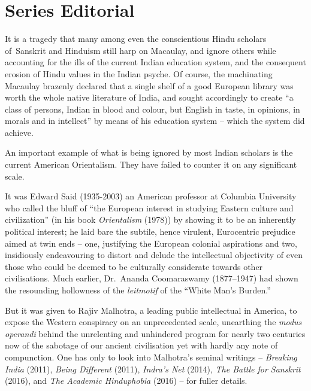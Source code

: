 \chapter*{Series Editorial}\label{gen_editorial}


It is a tragedy that many among even the conscientious Hindu scholars of~Sanskrit and Hinduism still harp on Macaulay, and ignore others while accounting for the ills of the current Indian education system, and the consequent erosion of Hindu values in the Indian psyche. Of course, the machinating Macaulay brazenly declared that a single shelf of a good European library was worth the whole native literature of India, and sought accordingly to create “a class of persons, Indian in blood and colour, but English in taste, in opinions, in morals and in intellect” by means of his education system -- which the system did achieve. 

An important example of what is being ignored by most Indian scholars is the current American Orientalism. They have failed to counter it on any significant scale. 

It was Edward Said (1935-2003) an American professor at Columbia University who called the bluff of “the European interest in studying Eastern culture and civilization” (in his book {\sl Orientalism} (1978)) by showing it to be an inherently political interest; he laid bare the subtile, hence virulent, Eurocentric prejudice aimed at twin ends – one, justifying the European colonial aspirations and two, insidiously endeavouring to distort  and delude the intellectual objectivity of even those who could be deemed to be culturally considerate towards other civilisations. Much earlier, Dr.\ Ananda Coomaraswamy (1877--1947) had shown the resounding hollowness of the {\sl leitmotif} of the “White Man’s Burden.” 

But it was given to Rajiv Malhotra, a leading public intellectual in America, to expose the Western conspiracy on an unprecedented scale, unearthing the {\sl modus operandi} behind the unrelenting and unhindered program for nearly two centuries now of the sabotage of our ancient civilisation yet with hardly any note of compunction.  One has only to look into Malhotra’s seminal writings -- {\sl Breaking India} (2011), {\sl Being Different} (2011), {\sl Indra’s Net} (2014), {\sl The Battle for Sanskrit} (2016), and {\sl The Academic Hinduphobia} (2016) -- for fuller details.
\vskip 1.5pt

